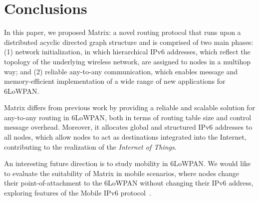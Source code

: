 \section{Conclusions}\label{sec:conclusion}

In this paper, we proposed Matrix: a novel routing protocol that runs upon a distributed acyclic directed graph structure and is comprised of two main phases: (1) network initialization, in which hierarchical IPv6 addresses, which reflect the topology of the underlying wireless network, are assigned to nodes in a multihop way; and (2) reliable any-to-any communication, which enables message and memory-efficient implementation of a wide range of new applications for 6LoWPAN.

Matrix differs from previous work by providing a reliable and scalable solution for any-to-any routing in 6LoWPAN, both in terms of routing table size and control message overhead. Moreover, it allocates global and structured IPv6 addresses to all nodes, which allow nodes to act as destinations integrated into the Internet, contributing to the realization of the \textit{Internet of Things}.

An interesting future direction is to study mobility in 6LoWPAN. We would like to evaluate the suitability of Matrix in mobile scenarios, where nodes change their point-of-attachment to the 6LoWPAN without changing their IPv6 address, exploring features of the Mobile IPv6 protocol~\cite{mobileip}.
